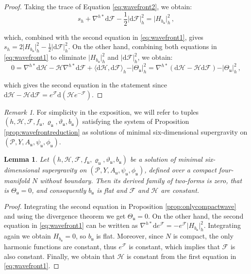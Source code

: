 \documentclass[10pt,a4paper,twoside,reqno]{amsart}
\theoremstyle{plain}
\newtheorem{lemma}[thm]{Lemma}
\theoremstyle{definition}
\theoremstyle{remark}
\newtheorem{remark}[thm]{Remark}
\def\dd{\mathrm{d}}
\def\cH{\mathcal{H}}
\def\cP{\mathcal{P}}
\def\cP{\mathcal{P}}
\def\cF{\mathcal{F}}
\def\cH{\mathcal{H}}
\def\dd{\mathrm{d}}
\def\fru{\mathfrak{u}}
\begin{document}
\begin{proof}
Taking the trace of Equation \eqref{eq:wavefront2}, we obtain:    
\begin{equation*}
s_h + \nabla^{h\ast}\dd\cF - \frac{1}{2}\vert\dd \cF\vert^2_h =   \vert H_{b_{\fru}}\vert^2_h \, ,
\end{equation*}

\noindent
which, combined with the second equation in \eqref{eq:wavefront1}, gives $s_h = 2 \vert H_{b_{\fru}}\vert^2_h - \frac{1}{2}\vert\dd \cF\vert^2_h$. On the other hand, combining both equations in \eqref{eq:wavefront1} to eliminate $\vert H_{b_{\fru}}\vert^2_h$ and $\vert \dd\cF \vert^2_h$, we obtain:
\begin{equation*}
0 = \nabla^{h\ast} \dd\cH - \cH \nabla^{h\ast} \dd\cF  + \langle \dd\cH, \dd\cF \rangle_h  -   \vert\Theta_{\fru} \vert^2_h = \nabla^{h\ast} (\dd\cH - \cH  \dd\cF)   -   \vert\Theta_{\fru} \vert^2_h \, ,
\end{equation*}

\noindent
which gives the second equation in the statement since $\dd\cH - \cH \dd\cF = e^{\cF} \dd (\cH e^{-\cF})$.
\end{proof}

\begin{remark}
\label{remark:tuples}
For simplicity in the exposition, we will refer to tuples $(h,\cH,\cF, f_{\fru} , \varrho_{\fru}, \vartheta_{\fru} , b_{\fru})$ satisfying the system of Proposition \ref{prop:wavefrontreduction} as solutions of minimal six-dimensional supergravity on $(\cP,Y,A_{\fru} , \psi_{\fru} , \phi_{\fru})$.
\end{remark}

\begin{lemma}
\label{lemma:Ncompact}
Let $(h,\cH,\cF, f_{\fru} , \varrho_{\fru}, \vartheta_{\fru} , b_{\fru})$ be a solution of minimal six-dimensional supergravity on $(\cP,Y,A_{\fru} , \psi_{\fru} , \phi_{\fru})$, defined over a compact four-manifold $N$ without boundary. Then its derived family of two-forms is zero, that is $\Theta_{\fru}=0$, and consequently $b_{\fru}$ is flat and $\cF$ and $\cH$ are constant.
\end{lemma}

\begin{proof}
Integrating the second equation in Proposition \ref{prop:onlycompactwave} and using the divergence theorem we get $\Theta_{\fru}=0$. On the other hand, the second equation in \eqref{eq:wavefront1} can be written as $\nabla^{h*}\dd e^\cF = -e^{\cF}\vert H_{b_{\fru}} \vert^2_h$. Integrating again we obtain $H_{b_{\fru}}=0$, so $b_{\fru}$ is flat. Moreover, since $N$ is compact, the only harmonic functions are constant, thus $e^\cF$ is constant, which implies that $\cF$ is also constant. Finally, we obtain that $\cH$ is constant from the first equation in \eqref{eq:wavefront1}.
\end{proof}
\end{document}
